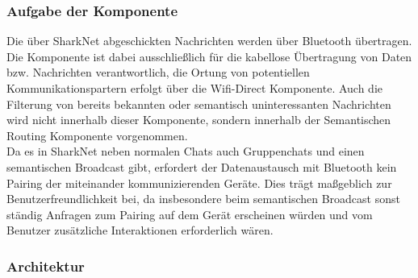 

\subsubsection{Aufgabe der Komponente}
Die über SharkNet abgeschickten Nachrichten werden über Bluetooth übertragen. Die Komponente ist dabei ausschließlich für die kabellose Übertragung von Daten bzw. Nachrichten verantwortlich, die Ortung von potentiellen Kommunikationspartern erfolgt über die Wifi-Direct Komponente. Auch die Filterung von bereits bekannten oder semantisch uninteressanten Nachrichten wird nicht innerhalb dieser Komponente, sondern innerhalb der Semantischen Routing Komponente vorgenommen.
\\Da es in SharkNet neben normalen Chats auch Gruppenchats und einen semantischen Broadcast gibt, erfordert der Datenaustausch mit Bluetooth kein Pairing der miteinander kommunizierenden Geräte. Dies trägt maßgeblich zur Benutzerfreundlichkeit bei, da insbesondere beim semantischen Broadcast sonst ständig Anfragen zum Pairing auf dem Gerät erscheinen würden und vom Benutzer zusätzliche Interaktionen erforderlich wären.



\subsubsection{Architektur}

\label{ch:bluetoothoverview}

